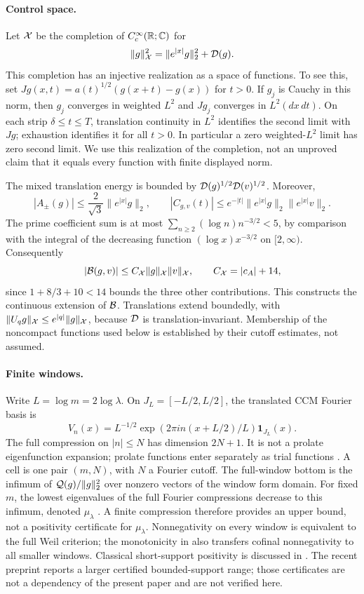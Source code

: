 \paragraph{Control space.}
Let $\mathcal X$ be the completion of $C_c^\infty(\mathbb R;\mathbb C)$ for
\[
 \|g\|_{\mathcal X}^2=\|e^{|x|}g\|_2^2+\mathcal D(g).
\]
This completion has an injective realization as a space of functions.
To see this, set
$Jg(x,t)=a(t)^{1/2}(g(x+t)-g(x))$ for $t>0$.
If $g_j$ is Cauchy in this norm, then $g_j$ converges in weighted $L^2$
and $Jg_j$ converges in $L^2(dx\,dt)$. On each strip
$\delta\le t\le T$, translation continuity in $L^2$ identifies the
second limit with $Jg$; exhaustion identifies it for all $t>0$.
In particular a zero weighted-$L^2$ limit has zero second limit.
We use this realization of the completion, not an unproved claim that
it equals every function with finite displayed norm.

The mixed translation energy is bounded by
$\mathcal D(g)^{1/2}\mathcal D(v)^{1/2}$. Moreover,
\[
 |A_\pm(g)|\le\frac2{\sqrt3}\|e^{|x|}g\|_2,
 \qquad
 |C_{g,v}(t)|\le e^{-|t|}
       \|e^{|x|}g\|_2\|e^{|x|}v\|_2.
\]
The prime coefficient sum is at most
$\sum_{n\ge2}(\log n)n^{-3/2}<5$, by comparison with the
integral of the decreasing function $(\log x)x^{-3/2}$ on $[2,\infty)$.
Consequently
\[
 |\mathcal B(g,v)|\le C_{\mathcal X}\|g\|_{\mathcal X}\|v\|_{\mathcal X},
 \qquad C_{\mathcal X}=|c_A|+14,
\]
since $1+8/3+10<14$ bounds the three other contributions.
This constructs the continuous extension of $\mathcal B$.
Translations extend boundedly, with
$\|U_qg\|_{\mathcal X}\le e^{|q|}\|g\|_{\mathcal X}$, because $\mathcal D$ is
translation-invariant. Membership of the noncompact functions used
below is established by their cutoff estimates, not assumed.

\paragraph{Finite windows.}
Write $L=\log m=2\log\lambda$. On
$J_L=[-L/2,L/2]$, the translated CCM Fourier basis is
\[
 V_n(x)=L^{-1/2}\exp(2\pi in(x+L/2)/L)\mathbf1_{J_L}(x).
\]
The full compression on $|n|\le N$ has dimension $2N+1$.
It is not a prolate eigenfunction expansion; prolate functions enter
separately as trial functions \cite{CCM-ZST-2025,ConnesMoscovici2021}.
A cell is one pair $(m,N)$, with $N$ a Fourier cutoff.
The full-window bottom is the infimum of
$\mathcal Q(g)/\|g\|_2^2$ over nonzero vectors of the window form domain.
For fixed $m$, the lowest eigenvalues of the full Fourier compressions
decrease to this infimum, denoted $\mu_\lambda$
\cite[Proposition 3.4]{CCM-ZST-2025}. A finite compression therefore
provides an upper bound, not a positivity certificate for $\mu_\lambda$.
Nonnegativity on every window is equivalent to the full Weil criterion;
the monotonicity in \cite[Corollary 3.7]{CCM-ZST-2025} also transfers
cofinal nonnegativity to all smaller windows.
Classical short-support positivity is discussed in
\cite{YOSHIDA-HERMITIAN-1992,BOMBIERI-WEILQF-2000,CC-WEILPOS-2020}.
The recent preprint \cite{XUEFENGZHU-2026} reports a larger certified
bounded-support range; those certificates are not a dependency of the
present paper and are not verified here.
